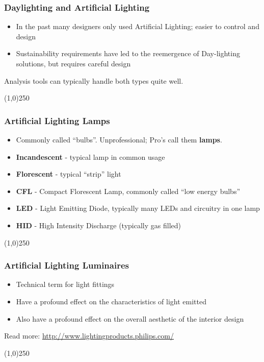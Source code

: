 \begin{frame}
\frametitle{Daylighting and Artificial Lighting}
\begin{itemize}
	\item In the past many designers only used Artificial Lighting; easier to control and design
	\item Sustainability requirements have led to the reemergence of Day-lighting solutions, but requires careful design
\end{itemize}
Analysis tools can typically handle both types quite well.
\end{frame}
\begin{center}\line(1,0){250}\end{center}


\begin{frame}
\frametitle{Artificial Lighting \hfill\hfill Lamps}
\begin{itemize}
	\item Commonly called “bulbs”. Unprofessional; Pro’s call them \textbf{lamps}.
	\item \textbf{Incandescent} - typical lamp in common usage
	\item \textbf{Florescent} - typical “strip” light
	\item \textbf{CFL} - Compact Florescent Lamp, commonly called “low energy bulbs”
	\item \textbf{LED} - Light Emitting Diode, typically many LEDs and circuitry in one lamp
	\item \textbf{HID} - High Intensity Discharge (typically gas filled)
\end{itemize}
\end{frame}
\begin{center}\line(1,0){250}\end{center}


\begin{frame}
\frametitle{Artificial Lighting \hfill\hfill Luminaires}
\begin{itemize}
	\item Technical term for light fittings
	\item Have a profound effect on the characteristics of light emitted
	\item Also have a profound effect on the overall aesthetic of the interior design
\end{itemize}
Read more: \href{http://www.lightingproducts.philips.com/}{http://www.lightingproducts.philips.com/}
\end{frame}
\begin{center}\line(1,0){250}\end{center}



